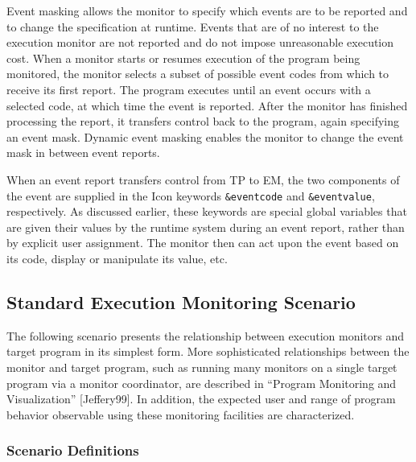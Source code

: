 \begin{list}{}{\itemsep 7pt}
	Event masking allows the monitor to specify which
	events are to be reported and to change the specification at runtime.
	Events that are of no interest to the execution
	monitor are not reported and do not impose unreasonable
	execution cost.
	When a monitor starts or resumes execution of the program being
	monitored, the monitor selects
	a subset of possible event codes from which to receive its first
	report.  The program executes until an event occurs with a selected
	code, at which time the event is reported.  After the monitor has
	finished processing the report, it transfers control back to the
	program, again specifying an event mask.  Dynamic event masking
	enables the monitor to change the event mask in between event reports.


	When an event report transfers control from TP to EM, the two
	components of the event are supplied in the Icon keywords
	{\tt \&eventcode} and {\tt \&eventvalue}, respectively.
	As discussed earlier, these
	keywords are special global variables that are given their values by
	the runtime system during an event report, rather than by explicit user
	assignment.  The monitor then can act upon the event
	based on its code, display or manipulate its value, etc.
\end{list}


\subsection*{Standard Execution Monitoring Scenario}

The following scenario presents the relationship between execution monitors
and target program in its simplest form.  More sophisticated relationships
between the monitor and target program, such as running many monitors on a
single target program via a monitor coordinator, are described in ``Program
Monitoring and Visualization'' [Jeffery99].  In addition, the expected user
and range of program behavior observable using these monitoring facilities
are characterized.

\subsubsection*{Scenario Definitions}

